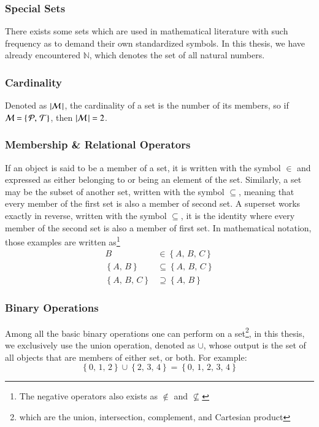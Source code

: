 %
\subsubsection{Special Sets}
There exists some sets which are used in mathematical literature with such frequency as to demand their own standardized symbols. In this thesis, we have already encountered $\mathbb{N}$, which denotes the set of all natural numbers.

%
\subsubsection{Cardinality}
Denoted as $|\mathcal{M}\,|$, the cardinality of a set is the number of its members, so if $\mathcal{M} = \left \{\,\mathcal{P},\,\mathcal{T}\right \}$, then $|\mathcal{M}\,| = 2$.

%
\subsubsection{Membership \& Relational Operators}
If an object is said to be a member of a set, it is written with the symbol $\in$ and expressed as either belonging to or being an element of the set. Similarly, a set may be the subset of another set, written with the symbol $\subseteq$, meaning that every member of the first set is also a member of second set. A superset works exactly in reverse, written with the symbol $\subseteq$, it is the identity where every member of the second set is also a member of first set. In mathematical notation, those examples are written as\footnote{The negative operators also exists as $\notin$ and $\nsubseteq$}
\begin{align}
	B & \in \left \{A,\,B,\,C\right \} \\
	\left \{A,\,B\right \} & \subseteq \left \{A,\,B,\,C\right \} \\
	\left \{A,\,B,\,C\right \} & \supseteq \left \{A,\,B\right \}
\end{align}

%
\subsubsection{Binary Operations}
Among all the basic binary operations one can perform on a set\footnote{which are the union, intersection, complement, and Cartesian product}, in this thesis, we exclusively use the union operation, denoted as $\cup$, whose output is the set of all objects that are members of either set, or both. For example:
\begin{equation}
	\left \{0,\,1,\,2\right \} \cup \left \{2,\,3,\,4\right \} = \left \{0,\,1,\,2,\,3,\,4\right \}
\end{equation}

